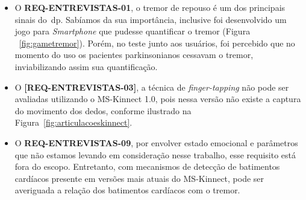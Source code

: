 \begin{itemize}
  \item O \textbf{REQ-ENTREVISTAS-01}, o tremor de repouso é um dos principais sinais do~\ac{dp}. Sabíamos da sua importância, inclusive foi desenvolvido um jogo para \textit{Smartphone} que pudesse quantificar o tremor (Figura ~\ref{fig:gametremor}). Porém, no teste junto aos usuários, foi percebido que no momento do uso os pacientes parkinsonianos cessavam o tremor, inviabilizando assim sua quantificação. 
	\item O \textbf{[REQ-ENTREVISTAS-03]}, a técnica de \textit{finger-tapping} não pode ser avaliadas utilizando o MS-Kinnect 1.0, pois nessa versão não existe a captura do movimento dos dedos, conforme ilustrado na Figura~\ref{fig:articulacoeskinnect}.
	\item O \textbf{REQ-ENTREVISTAS-09}, por envolver estado emocional e parâmetros que não estamos levando em consideração nesse trabalho, esse requisito está fora do escopo. Entretanto, com mecanismos de detecção de batimentos cardíacos presente em versões mais atuais do MS-Kinnect, pode ser averiguada a relação dos batimentos cardíacos com o tremor.
\end{itemize}






